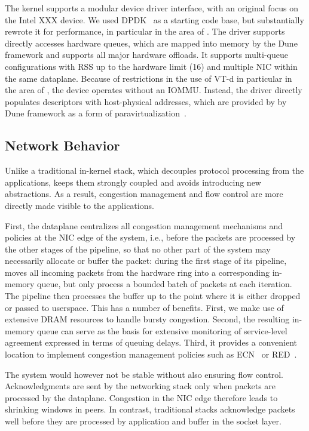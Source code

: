 The \ix kernel supports a modular device driver interface, with an
original focus on the Intel XXX device.  We used
DPDK~\cite{intel:dpdk} as a starting code base, but substantially
rewrote it for performance, in particular in the area of
.  The driver supports directly accesses hardware
queues, which are mapped into memory by the Dune framework and
supports all major hardware offloads.  It supports multi-queue
configurations with RSS up to the hardware limit (16) and multiple NIC
within the same dataplane.  Because of restrictions in the use of VT-d
in particular in the area of , the device operates without
an IOMMU.  Instead, the driver directly populates descriptors with
host-physical addresses, which are provided by by Dune framework as a
form of paravirtualization~\cite{DBLP:conf/sosp/BarhamDFHHHN03}.



\subsection{Network Behavior}
\label{sec:impl:net}

Unlike a traditional in-kernel stack, which decouples protocol
processing from the applications, \ix keeps them strongly coupled and
avoids introducing new abstractions.  As a result, congestion
management and flow control are more directly made visible to the
applications.

First, the \ix dataplane centralizes all congestion management
mechanisms and policies at the NIC edge of the system, i.e., before
the packets are processed by the other stages of the pipeline, so that
no other part of the system may necessarily allocate or buffer the
packet: during the first stage of its pipeline, \ix moves all incoming
packets from the hardware ring into a corresponding in-memory queue,
but only process a bounded batch of packets at each iteration.  The
pipeline then processes the buffer up to the point where it is either
dropped or passed to userspace.  This has a number of benefits.
First, we make use of extensive DRAM resources to handle bursty
congestion.  Second, the resulting in-memory queue can serve as the
basis for extensive monitoring of service-level agreement expressed in
terms of queuing delays.  Third, it provides a convenient location to
implement congestion management policies such as
ECN~\cite{ramakrishnan2001addition} or
RED~\cite{DBLP:journals/ton/FloydJ93}.

The system would however not be stable without also ensuring flow
control.  Acknowledgments are sent by the networking stack only when
packets are processed by the dataplane.  Congestion in the NIC edge
therefore leads to shrinking windows in peers.  In contrast, traditional stacks
acknowledge packets well before they are processed by application and
buffer in the socket layer.

